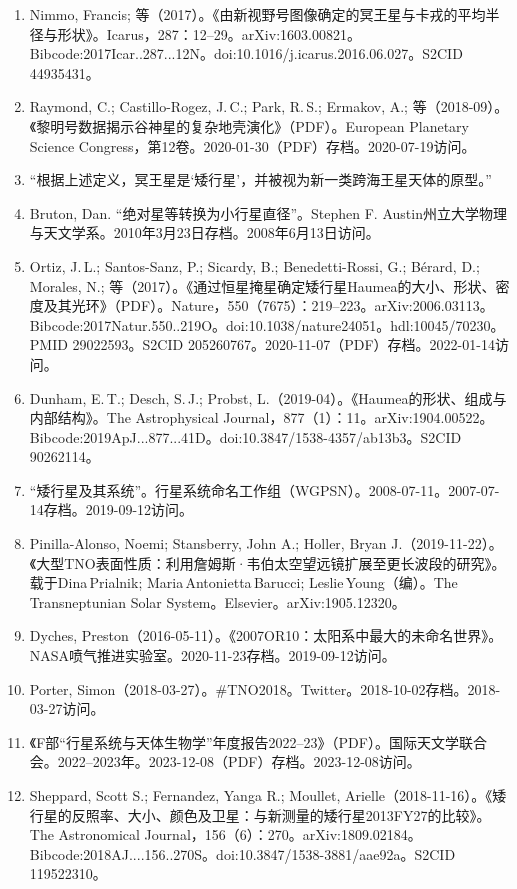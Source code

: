 \begin{enumerate}
\item Nimmo, Francis; 等（2017）。《由新视野号图像确定的冥王星与卡戎的平均半径与形状》。Icarus，287：12–29。arXiv:1603.00821。Bibcode:2017Icar..287...12N。doi:10.1016/j.icarus.2016.06.027。S2CID 44935431。
\item Raymond, C.; Castillo-Rogez, J.\,C.; Park, R.\,S.; Ermakov, A.; 等（2018-09）。《黎明号数据揭示谷神星的复杂地壳演化》（PDF）。European Planetary Science Congress，第12卷。2020-01-30（PDF）存档。2020-07-19访问。
\item “根据上述定义，冥王星是‘矮行星’，并被视为新一类跨海王星天体的原型。”
\item Bruton, Dan. “绝对星等转换为小行星直径”。Stephen F. Austin州立大学物理与天文学系。2010年3月23日存档。2008年6月13日访问。
\item Ortiz, J.\,L.; Santos-Sanz, P.; Sicardy, B.; Benedetti-Rossi, G.; Bérard, D.; Morales, N.; 等（2017）。《通过恒星掩星确定矮行星Haumea的大小、形状、密度及其光环》（PDF）。Nature，550（7675）：219–223。arXiv:2006.03113。Bibcode:2017Natur.550..219O。doi:10.1038/nature24051。hdl:10045/70230。PMID 29022593。S2CID 205260767。2020-11-07（PDF）存档。2022-01-14访问。
\item Dunham, E.\,T.; Desch, S.\,J.; Probst, L.（2019-04）。《Haumea的形状、组成与内部结构》。The Astrophysical Journal，877（1）：11。arXiv:1904.00522。Bibcode:2019ApJ...877...41D。doi:10.3847/1538-4357/ab13b3。S2CID 90262114。
\item “矮行星及其系统”。行星系统命名工作组（WGPSN）。2008-07-11。2007-07-14存档。2019-09-12访问。
\item Pinilla-Alonso, Noemi; Stansberry, John A.; Holler, Bryan J.（2019-11-22）。《大型TNO表面性质：利用詹姆斯·韦伯太空望远镜扩展至更长波段的研究》。载于Dina\,Prialnik; Maria\,Antonietta\,Barucci; Leslie\,Young（编）。The Transneptunian Solar System。Elsevier。arXiv:1905.12320。
\item Dyches, Preston（2016-05-11）。《2007OR10：太阳系中最大的未命名世界》。NASA喷气推进实验室。2020-11-23存档。2019-09-12访问。
\item Porter, Simon（2018-03-27）。#TNO2018。Twitter。2018-10-02存档。2018-03-27访问。
\item 《F部“行星系统与天体生物学”年度报告2022–23》（PDF）。国际天文学联合会。2022–2023年。2023-12-08（PDF）存档。2023-12-08访问。
\item Sheppard, Scott S.; Fernandez, Yanga R.; Moullet, Arielle（2018-11-16）。《矮行星的反照率、大小、颜色及卫星：与新测量的矮行星2013FY27的比较》。The Astronomical Journal，156（6）：270。arXiv:1809.02184。Bibcode:2018AJ....156..270S。doi:10.3847/1538-3881/aae92a。S2CID 119522310。

\end{enumerate}
